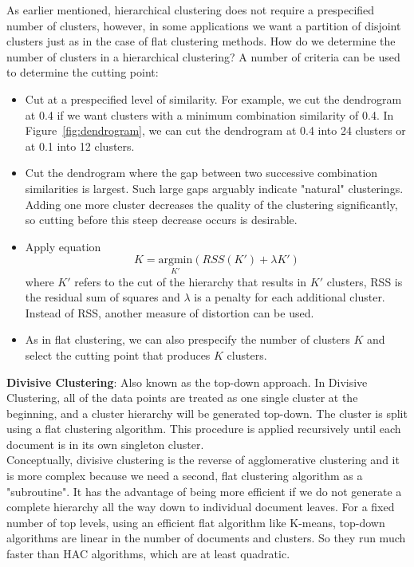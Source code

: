 \documentclass[conference]{IEEEtran}
\begin{document}
As earlier mentioned, hierarchical clustering does not require a prespecified number of clusters, however, in some applications we want a partition of disjoint clusters just as in the case of flat clustering methods. How do we determine the number of clusters in a hierarchical clustering? A number of criteria can be used to determine the cutting point:
\begin{itemize}
    \item Cut at a prespecified level of similarity. For example, we cut the dendrogram at 0.4 if we want clusters with a minimum combination similarity of 0.4. In Figure~\ref{fig:dendrogram}, we can cut the dendrogram at 0.4 into 24 clusters or at 0.1 into 12 clusters.
    \item Cut the dendrogram where the gap between two successive combination similarities is largest. Such large gaps arguably indicate "natural" clusterings. Adding one more cluster decreases the quality of the clustering significantly, so cutting before this steep decrease occurs is desirable. 
    \item Apply equation \[ K = \underset{K'}{\text{argmin}} \left( RSS(K') + \lambda K' \right) \] where \( K' \) refers to the cut of the hierarchy that results in \( K' \) clusters, RSS is the residual sum of squares and \( \lambda \) is a penalty for each additional cluster. Instead of RSS, another measure of distortion can be used. 
    \item As in flat clustering, we can also prespecify the number of clusters \( K \) and select the cutting point that produces \( K \) clusters. \\
\end{itemize}




\textbf{Divisive Clustering}: Also known as the top-down approach. In Divisive Clustering, all of the data points are treated as one single cluster at the beginning, and a cluster hierarchy will be generated top-down. The cluster is split using a flat clustering algorithm. This procedure is applied recursively until each document is in its own singleton cluster. \\ 

Conceptually, divisive clustering is the reverse of agglomerative clustering and it is more complex because we need a second, flat clustering algorithm as a "subroutine". It has the advantage of being more efficient if we do not generate a complete hierarchy all the way down to individual document leaves. For a fixed number of top levels, using an efficient flat algorithm like K-means, top-down algorithms are linear in the number of documents and clusters. So they run much faster than HAC algorithms, which are at least quadratic. \\
\end{document}

